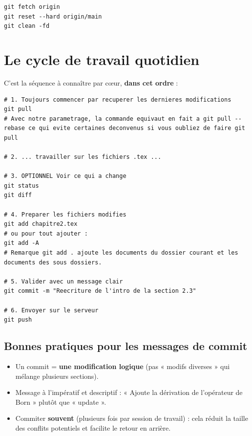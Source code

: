 \documentclass[11pt,a4paper]{article}
\begin{document}
\begin{lstlisting}[style=bashstyle]
git fetch origin
git reset --hard origin/main
git clean -fd
\end{lstlisting}
\section{Le cycle de travail quotidien}

C'est la séquence à connaître par cœur, \textbf{dans cet ordre} :

\begin{lstlisting}[style=bashstyle]
# 1. Toujours commencer par recuperer les dernieres modifications
git pull
# Avec notre parametrage, la commande equivaut en fait a git pull --rebase ce qui evite certaines deconvenus si vous oubliez de faire git pull

# 2. ... travailler sur les fichiers .tex ...

# 3. OPTIONNEL Voir ce qui a change
git status
git diff

# 4. Preparer les fichiers modifies
git add chapitre2.tex
# ou pour tout ajouter :
git add -A
# Remarque git add . ajoute les documents du dossier courant et les documents des sous dossiers. 

# 5. Valider avec un message clair
git commit -m "Reecriture de l'intro de la section 2.3"

# 6. Envoyer sur le serveur
git push
\end{lstlisting}

\subsection*{Bonnes pratiques pour les messages de commit}

\begin{itemize}
  \item Un commit = \textbf{une modification logique} (pas « modifs diverses » qui mélange plusieurs sections).
  \item Message à l'impératif et descriptif : « Ajoute la dérivation de l'opérateur de Born » plutôt que « update ».
  \item Commiter \textbf{souvent} (plusieurs fois par session de travail) : cela réduit la taille des conflits potentiels et facilite le retour en arrière.
\end{itemize}
\end{document}
